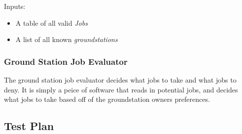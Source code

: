 \documentclass{article}
\begin{document}
\noindent
Inputs:

\begin{itemize}
  \item A table of all valid \textit{Jobs}
  \item A list of all known \textit{groundstations}
\end{itemize}


\subsubsection{Ground Station Job Evaluator}

The ground station job evaluator decides what jobs to take and what jobs to
deny. It is simply a peice of software that reads in potential jobs, and
decides what jobs to take based off of the groundstation owners preferences.

\subsection{Test Plan}
\end{document}
